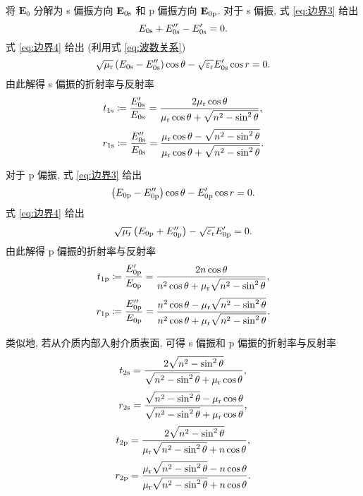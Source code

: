 \documentclass{article}
\begin{document}
将 $\mathbf E_0$ 分解为 s 偏振方向 $\mathbf E_{0\text s}$ 和 p 偏振方向 $\mathbf E_{0\text p}$.
对于 s 偏振, 式 \ref{eq:边界3} 给出
\begin{equation}
	E_{0\text s}+E_{0\text s}''-E_{0\text s}'=0.
\end{equation}
式 \ref{eq:边界4} 给出 (利用式 \ref{eq:波数关系})
\begin{equation}
	\sqrt{\mu_\mathrm r}\left(E_{0\text s}-E_{0\text s}''\right)\cos\theta-\sqrt{\varepsilon_\mathrm r}E_{0\text s}'\cos r=0.
\end{equation}
由此解得 s 偏振的折射率与反射率
\begin{equation}
	t_{1\text s}\coloneqq\frac{E_{0\text s}'}{E_{0\text s}}=\frac{2\mu_\mathrm r\cos\theta}{\mu_\mathrm r\cos\theta+\sqrt{n^2-\sin^2\theta}},
\end{equation}
\begin{equation}
	r_{1\text s}\coloneqq\frac{E_{0\text s}''}{E_{0\text s}}=\frac{\mu_\mathrm r\cos\theta-\sqrt{n^2-\sin^2\theta}}{\mu_\mathrm r\cos\theta+\sqrt{n^2-\sin^2\theta}}.
\end{equation}

对于 p 偏振, 式 \ref{eq:边界3} 给出
\begin{equation}
	\left(E_{0\text p}-E_{0\text p}''\right)\cos\theta-E_{0\text p}'\cos r=0.
\end{equation}
式 \ref{eq:边界4} 给出
\begin{equation}
	\sqrt{\mu_\mathrm r}\left(E_{0\text p}+E_{0\text p}''\right)-\sqrt{\varepsilon_\mathrm r}E_{0\text p}'=0.
\end{equation}
由此解得 p 偏振的折射率与反射率
\begin{equation}
	t_{1\text p}\coloneqq\frac{E_{0\text p}'}{E_{0\text p}}=\frac{2n\cos\theta}{n^2\cos\theta+\mu_\mathrm r\sqrt{n^2-\sin^2\theta}},
\end{equation}
\begin{equation}
	r_{1\text p}\coloneqq\frac{E_{0\text p}''}{E_{0\text p}}=\frac{n^2\cos\theta-\mu_\mathrm r\sqrt{n^2-\sin^2\theta}}{n^2\cos\theta+\mu_\mathrm r\sqrt{n^2-\sin^2\theta}}.
\end{equation}

类似地, 若从介质内部入射介质表面, 可得 s 偏振和 p 偏振的折射率与反射率
\begin{equation}
	t_{2\text s}=\frac{2\sqrt{n^2-\sin^2\theta}}{\sqrt{n^2-\sin^2\theta}+\mu_\mathrm r\cos\theta},
\end{equation}
\begin{equation}
	r_{2\text s}=\frac{\sqrt{n^2-\sin^2\theta}-\mu_{\mathrm r}\cos\theta}{\sqrt{n^2-\sin^2\theta}+\mu_{\mathrm r}\cos\theta},
\end{equation}
\begin{equation}
	t_{2\text p}=\frac{2\sqrt{n^2-\sin^2\theta}}{\mu_\mathrm r\sqrt{n^2-\sin^2\theta}+n\cos\theta},
\end{equation}
\begin{equation}
	r_{2\text p}=\frac{\mu_\mathrm r\sqrt{n^2-\sin^2\theta}-n\cos\theta}{\mu_\mathrm r\sqrt{n^2-\sin^2\theta}+n\cos\theta}.
\end{equation}
\end{document}

